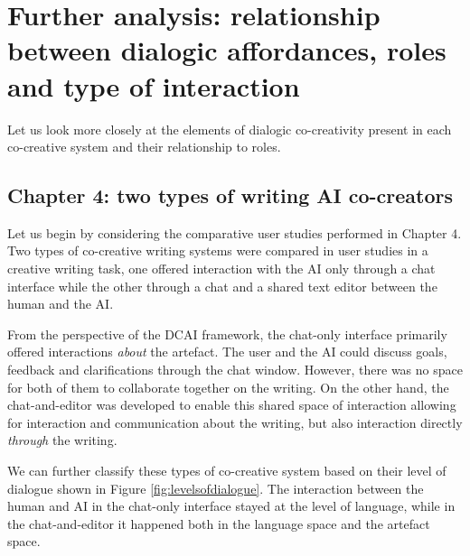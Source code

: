 \section{Further analysis: relationship between dialogic affordances, roles and type of interaction}

Let us look more closely at the elements of dialogic co-creativity present in each co-creative system and their relationship to roles. 

\subsection{Chapter 4: two types of writing AI co-creators}

Let us begin by considering the comparative user studies performed in Chapter 4. Two types of co-creative writing systems were compared in user studies in a creative writing task, one offered interaction with the AI only through a chat interface while the other through a chat and a shared text editor between the human and the AI. 

From the perspective of the DCAI framework, the chat-only interface primarily offered interactions \textit{about} the artefact. The user and the AI could discuss goals, feedback and clarifications through the chat window. However, there was no space for both of them to collaborate together on the writing. On the other hand, the chat-and-editor was developed to enable this shared space of interaction allowing for interaction and communication about the writing, but also interaction directly \textit{through} the writing. 

We can further classify these types of co-creative system based on their level of dialogue shown in Figure \ref{fig:levelsofdialogue}. The interaction between the human and AI in the chat-only interface stayed at the level of language, while in the chat-and-editor it happened both in the language space and the artefact space. 

